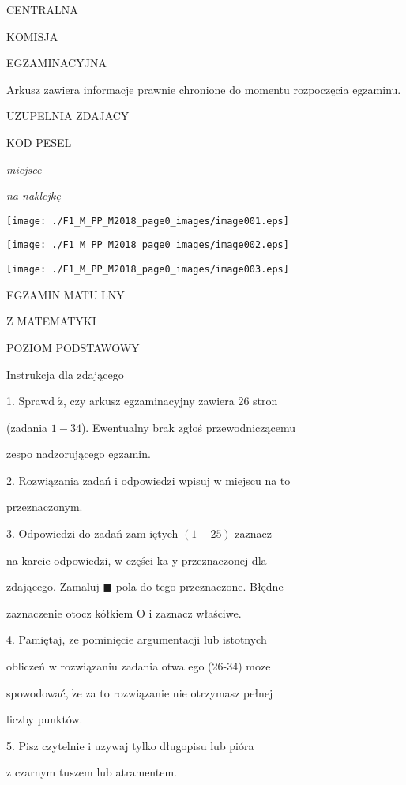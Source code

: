 \documentclass[a4paper,12pt]{article}
\begin{document}
CENTRALNA

KOMISJA

EGZAMINACYJNA

Arkusz zawiera informacje prawnie chronione do momentu rozpoczęcia egzaminu.

UZUPELNIA ZDAJACY

KOD PESEL

{\it miejsce}

{\it na naklejkę}
\begin{center}
\texttt{[image: ./F1\_M\_PP\_M2018\_page0\_images/image001.eps]}

\texttt{[image: ./F1\_M\_PP\_M2018\_page0\_images/image002.eps]}

\texttt{[image: ./F1\_M\_PP\_M2018\_page0\_images/image003.eps]}
\end{center}
EGZAMIN MATU LNY

Z MATEMATYKI

POZIOM PODSTAWOWY

Instrukcja dla zdającego

1. Sprawd $\acute{\mathrm{z}}$, czy arkusz egzaminacyjny zawiera 26 stron

(zadania $1-34$). Ewentualny brak zgłoś przewodniczącemu

zespo nadzorującego egzamin.

2. Rozwiązania zadań i odpowiedzi wpisuj w miejscu na to

przeznaczonym.

3. Odpowiedzi do zadań zam iętych $(1-25)$ zaznacz

na karcie odpowiedzi, w części ka $\mathrm{y}$ przeznaczonej dla

zdającego. Zamaluj $\blacksquare$ pola do tego przeznaczone. Błędne

zaznaczenie otocz kółkiem $\mathrm{O}$ i zaznacz właściwe.

4. Pamiętaj, $\dot{\mathrm{z}}\mathrm{e}$ pominięcie argumentacji lub istotnych

obliczeń w rozwiązaniu zadania otwa ego (26-34) $\mathrm{m}\mathrm{o}\dot{\mathrm{z}}\mathrm{e}$

spowodować, $\dot{\mathrm{z}}\mathrm{e}$ za to rozwiązanie nie otrzymasz pełnej

liczby punktów.

5. Pisz czytelnie i uzywaj tylko długopisu lub pióra

z czarnym tuszem lub atramentem.
\end{document}
